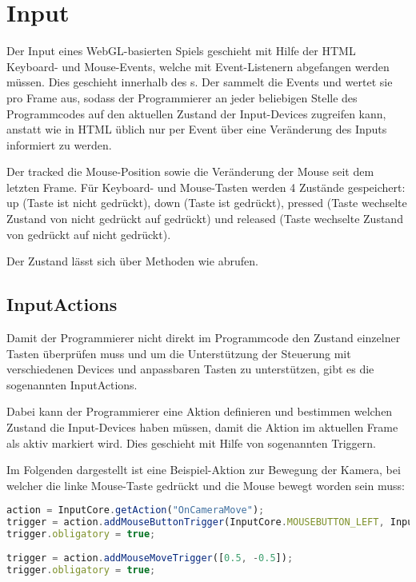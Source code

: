 \chapter{Input}

Der Input eines WebGL-basierten Spiels geschieht mit Hilfe der HTML Keyboard- und Mouse-Events, welche mit Event-Listenern abgefangen werden müssen. Dies geschieht innerhalb des s. Der  sammelt die Events und wertet sie pro Frame aus, sodass der Programmierer an jeder beliebigen Stelle des Programmcodes auf den aktuellen Zustand der Input-Devices zugreifen kann, anstatt wie in HTML üblich nur per Event über eine Veränderung des Inputs informiert zu werden.

Der  tracked die Mouse-Position sowie die Veränderung der Mouse seit dem letzten Frame. Für Keyboard- und Mouse-Tasten werden 4 Zustände gespeichert: up (Taste ist nicht gedrückt), down (Taste ist gedrückt), pressed (Taste wechselte Zustand von nicht gedrückt auf gedrückt) und released (Taste wechselte Zustand von gedrückt auf nicht gedrückt).

Der Zustand lässt sich über Methoden wie  abrufen.

\section{InputActions}

Damit der Programmierer nicht direkt im Programmcode den Zustand einzelner Tasten überprüfen muss und um die Unterstützung der Steuerung mit verschiedenen Devices und anpassbaren Tasten zu unterstützen, gibt es die sogenannten InputActions.

Dabei kann der Programmierer eine Aktion definieren und bestimmen welchen Zustand die Input-Devices haben müssen, damit die Aktion im aktuellen Frame als aktiv markiert wird. Dies geschieht mit Hilfe von sogenannten Triggern.

\newpage
Im Folgenden dargestellt ist eine Beispiel-Aktion zur Bewegung der Kamera, bei welcher die linke Mouse-Taste gedrückt und die Mouse bewegt worden sein muss:

\begin{lstlisting}[language=JavaScript, caption=Beispiel: \textprog{InputAction}]
action = InputCore.getAction("OnCameraMove");
trigger = action.addMouseButtonTrigger(InputCore.MOUSEBUTTON_LEFT, InputCore.MOUSEBUTTON_STATE_DOWN);
trigger.obligatory = true;
			
trigger = action.addMouseMoveTrigger([0.5, -0.5]);
trigger.obligatory = true;
\end{lstlisting}

